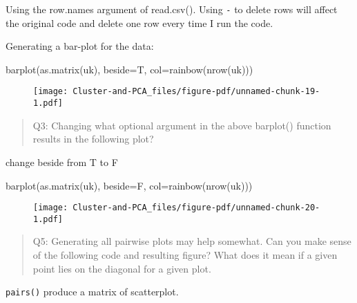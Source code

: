 \documentclass[
  letterpaper,
  DIV=11,
  numbers=noendperiod]{scrartcl}
\newenvironment{Shaded}{\begin{snugshade}}{\end{snugshade}}
\newcommand{\AttributeTok}[1]{\textcolor[rgb]{0.40,0.45,0.13}{#1}}
\newcommand{\FunctionTok}[1]{\textcolor[rgb]{0.28,0.35,0.67}{#1}}
\newcommand{\NormalTok}[1]{\textcolor[rgb]{0.00,0.23,0.31}{#1}}
\begin{document}
Using the row.names argument of read.csv(). Using \texttt{-} to delete
rows will affect the original code and delete one row every time I run
the code.

Generating a bar-plot for the data:

\begin{Shaded}
\begin{Highlighting}[]
\FunctionTok{barplot}\NormalTok{(}\FunctionTok{as.matrix}\NormalTok{(uk), }\AttributeTok{beside=}\NormalTok{T, }\AttributeTok{col=}\FunctionTok{rainbow}\NormalTok{(}\FunctionTok{nrow}\NormalTok{(uk)))}
\end{Highlighting}
\end{Shaded}

\begin{figure}[H]

{\centering \texttt{[image: Cluster-and-PCA\_files/figure-pdf/unnamed-chunk-19-1.pdf]}

}

\end{figure}

\begin{quote}
Q3: Changing what optional argument in the above barplot() function
results in the following plot?
\end{quote}

change beside from T to F

\begin{Shaded}
\begin{Highlighting}[]
\FunctionTok{barplot}\NormalTok{(}\FunctionTok{as.matrix}\NormalTok{(uk), }\AttributeTok{beside=}\NormalTok{F, }\AttributeTok{col=}\FunctionTok{rainbow}\NormalTok{(}\FunctionTok{nrow}\NormalTok{(uk)))}
\end{Highlighting}
\end{Shaded}

\begin{figure}[H]

{\centering \texttt{[image: Cluster-and-PCA\_files/figure-pdf/unnamed-chunk-20-1.pdf]}

}

\end{figure}

\begin{quote}
Q5: Generating all pairwise plots may help somewhat. Can you make sense
of the following code and resulting figure? What does it mean if a given
point lies on the diagonal for a given plot.
\end{quote}

\texttt{pairs()} produce a matrix of scatterplot.
\end{document}
